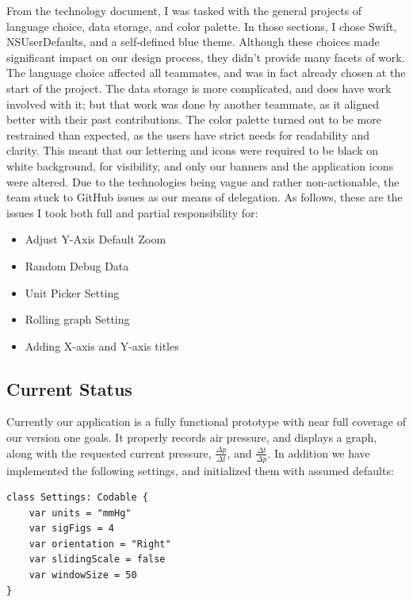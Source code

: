 \documentclass[onecolumn, draftclsnofoot,10pt, compsoc]{IEEEtran}
\begin{document}
From the technology document, I was tasked with the general projects of language choice, data storage, and color palette.
In those sections, I chose Swift, NSUserDefaults, and a self-defined blue theme.
Although these choices made significant impact on our design process, they didn't provide many facets of work.
The language choice affected all teammates, and was in fact already chosen at the start of the project.
The data storage is more complicated, and does have work involved with it; but that work was done by another teammate, as it aligned better with their past contributions.
The color palette turned out to be more restrained than expected, as the users have strict needs for readability and clarity.
This meant that our lettering and icons were required to be black on white background, for visibility, and only our banners and the application icons were altered.
Due to the technologies being vague and rather non-actionable, the team stuck to GitHub issues as our means of delegation.
As follows, these are the issues I took both full and partial responsibility for:

\begin{itemize}
  \item Adjust Y-Axis Default Zoom
  \item Random Debug Data
  \item Unit Picker Setting
  \item Rolling graph Setting
  \item Adding X-axis and Y-axis titles
\end{itemize}

\subsection{Current Status}

Currently our application is a fully functional prototype with near full coverage of our version one goals.
It properly records air pressure, and displays a graph, along with the requested current pressure, $\frac{\Delta p}{\Delta t}$, and $\frac{\Delta t}{\Delta p}$.
In addition we have implemented the following settings, and initialized them with assumed defaults:

\begin{lstlisting}
class Settings: Codable {
    var units = "mmHg"
    var sigFigs = 4
    var orientation = "Right"
    var slidingScale = false
    var windowSize = 50
}
\end{lstlisting}
\end{document}
